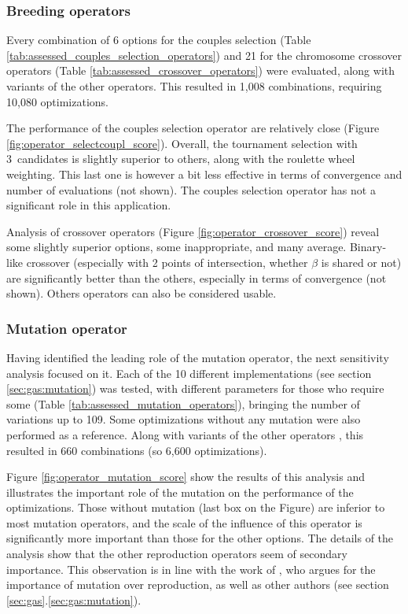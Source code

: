 \documentclass{ametsoc}
\begin{document}
\subsubsection{Breeding operators}

Every combination of 6 options for the couples selection (Table \ref{tab:assessed_couples_selection_operators}) and 21 for the chromosome crossover operators (Table \ref{tab:assessed_crossover_operators}) were evaluated, along with variants of the other operators. This resulted in 1,008 combinations, requiring 10,080 optimizations.

The performance of the couples selection operator are relatively close (Figure \ref{fig:operator_selectcoupl_score}). Overall, the tournament selection with 3~candidates is slightly superior to others, along with the roulette wheel weighting. This last one is however a bit less effective in terms of convergence and number of evaluations (not shown). The couples selection operator has not a significant role in this application. 

Analysis of crossover operators (Figure \ref{fig:operator_crossover_score}) reveal some slightly superior options, some inappropriate, and many average. Binary-like crossover (especially with 2 points of intersection, whether $\beta$ is shared or not) are significantly better than the others, especially in terms of convergence (not shown). Others operators can also be considered usable.
	

\subsubsection{Mutation operator}
\label{sec:assessment:mutation}

Having identified the leading role of the mutation operator, the next sensitivity analysis focused on it. Each of the 10 different implementations (see section \ref{sec:gas:mutation}) was tested, with different parameters for those who require some (Table \ref{tab:assessed_mutation_operators}), bringing the number of variations up to 109. Some optimizations without any mutation were also performed as a reference. Along with variants of the other operators \citep[see][for the details]{Horton2012a}, this resulted in 660 combinations (so 6,600 optimizations).

Figure \ref{fig:operator_mutation_score} show the results of this analysis and illustrates the important role of the mutation on the performance of the optimizations. Those without mutation (last box on the Figure) are inferior to most mutation operators, and the scale of the influence of this operator is significantly more important than those for the other options. The details of the analysis \citep[see][]{Horton2012a} show that the other reproduction operators seem of secondary importance. This observation is in line with the work of \citet{Back1996a}, who argues for the importance of mutation over reproduction, as well as other authors (see section \ref{sec:gas}.\ref{sec:gas:mutation}).
\end{document}
